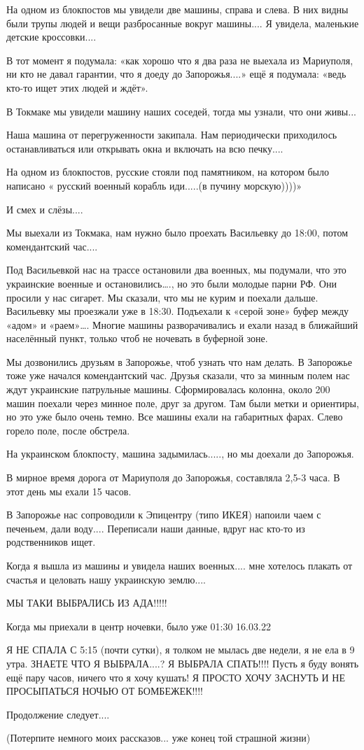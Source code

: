 На одном из блокпостов мы увидели две машины, справа и слева. В них видны были
трупы людей и вещи разбросанные вокруг машины.... Я увидела, маленькие детские
кроссовки....

В тот момент я подумала: «как хорошо что я два раза не выехала из Мариуполя, ни
кто не давал гарантии, что я доеду до Запорожья....» ещё я подумала: «ведь кто-то
ищет этих людей и ждёт».

В Токмаке мы увидели машину наших соседей, тогда мы узнали, что они живы...

Наша машина от перегруженности закипала. Нам периодически приходилось
останавливаться или открывать окна и включать на всю печку....

На одном из блокпостов, русские стояли под памятником, на котором было написано
« русский военный корабль иди.....(в пучину морскую))))»

И смех и слёзы....

Мы выехали из Токмака, нам нужно было проехать Васильевку до 18:00, потом
комендантский час....

Под Васильевкой нас на трассе остановили два военных, мы подумали, что это
украинские военные и остановились…., но это были молодые парни РФ. Они просили
у нас сигарет. Мы сказали, что мы не курим и поехали дальше. Васильевку мы
проезжали уже в 18:30. Подъехали к «серой зоне» буфер между «адом» и «раем»….
Многие машины разворачивались и ехали назад в ближайший населённый пункт,
только чтоб не ночевать в буферной зоне. 

Мы дозвонились друзьям в Запорожье, чтоб узнать что нам делать. В Запорожье
тоже уже начался комендантский час. Друзья сказали, что за минным полем нас
ждут украинские патрульные машины. Сформировалась колонна, около 200 машин
поехали через минное поле, друг за другом. Там были метки и ориентиры, но это
уже было очень темно. Все машины ехали на габаритных фарах. Слево горело поле,
после обстрела. 

На украинском блокпосту, машина задымилась....., но мы доехали до Запорожья. 

В мирное время дорога от Мариуполя до Запорожья, составляла 2,5-3 часа. В этот
день мы ехали 15 часов. 

В Запорожье нас сопроводили к Эпицентру (типо ИКЕЯ) напоили чаем с печеньем,
дали воду....  Переписали наши данные, вдруг нас кто-то из родственников ищет. 

Когда я вышла из машины и увидела наших военных.... мне хотелось плакать от
счастья и целовать нашу украинскую землю....

МЫ ТАКИ ВЫБРАЛИСЬ ИЗ АДА!!!!!

Когда мы приехали в центр ночевки, было уже 01:30 16.03.22

Я НЕ СПАЛА С 5:15 (почти сутки), я толком не мылась две недели, я не ела в 9
утра. ЗНАЕТЕ ЧТО Я ВЫБРАЛА....? Я ВЫБРАЛА СПАТЬ!!!! Пусть я буду вонять ещё пару
часов, ничего что я хочу кушать! Я ПРОСТО ХОЧУ ЗАСНУТЬ И НЕ ПРОСЫПАТЬСЯ НОЧЬЮ
ОТ БОМБЕЖЕК!!!! 

Продолжение следует....

(Потерпите немного моих рассказов... уже конец той страшной жизни)

